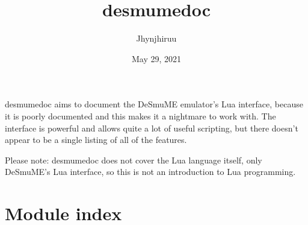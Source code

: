 \documentclass[letterpaper,10pt,english]{sphinxmanual}
\title{desmume\sphinxhyphen{}doc}
\date{May 29, 2021}
\author{Jhynjhiruu}
\begin{document}
\pagestyle{empty}
\sphinxmaketitle
\pagestyle{plain}
\sphinxtableofcontents
\pagestyle{normal}
\label{\detokenize{index::doc}}


\sphinxAtStartPar
desmume\sphinxhyphen{}doc aims to document the DeSmuME emulator’s Lua interface, because it is poorly documented and this makes it a nightmare to work with.
The interface is powerful and allows quite a lot of useful scripting, but there doesn’t appear to be a single listing of all of the features.

\sphinxAtStartPar
Please note: desmume\sphinxhyphen{}doc does not cover the Lua language itself, only DeSmuME’s Lua interface, so this is not an introduction to Lua programming.


\chapter{Module index}
\end{document}
